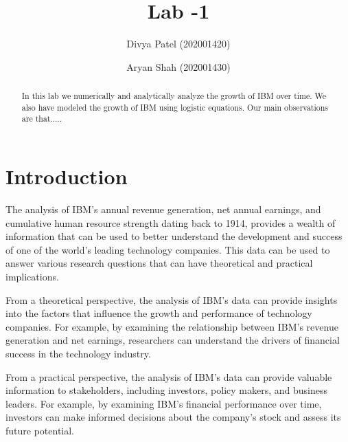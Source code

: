 \documentclass[aps,twocolumn,10pt,reprint]{revtex4}
\begin{document}
\title{Lab -1}

\author{Divya Patel (202001420)}
\author{Aryan Shah (202001430)}

\begin{abstract}

In this lab we numerically and analytically analyze the growth of IBM over time. We also have modeled the growth of IBM using logistic equations. Our main observations are that.....   

\end{abstract}
\maketitle
\section{Introduction}
The analysis of IBM's annual revenue generation, net annual earnings, and cumulative human resource strength dating back to 1914, provides a wealth of information that can be used to better understand the development and success of one of the world's leading technology companies. This data can be used to answer various research questions that can have theoretical and practical implications.

From a theoretical perspective, the analysis of IBM's data can provide insights into the factors that influence the growth and performance of technology companies. For example, by examining the relationship between IBM's revenue generation and net earnings, researchers can understand the drivers of financial success in the technology industry.

From a practical perspective, the analysis of IBM's data can provide valuable information to stakeholders, including investors, policy makers, and business leaders. For example, by examining IBM's financial performance over time, investors can make informed decisions about the company's stock and assess its future potential. 
\end{document}
